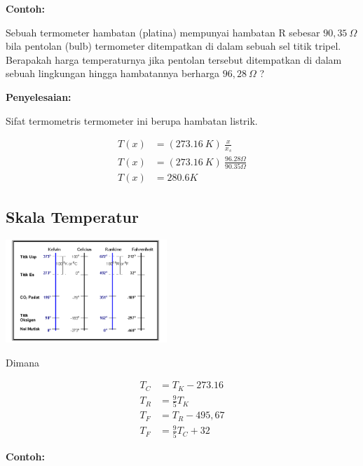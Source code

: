 \documentclass[twocolumn, 11pt]{article}%
\begin{document}
        \textbf{Contoh:}

        Sebuah termometer hambatan (platina) mempunyai hambatan R sebesar $90,35\ \Omega$ bila pentolan (bulb) termometer ditempatkan di dalam sebuah sel titik tripel. Berapakah harga temperaturnya jika pentolan tersebut ditempatkan di dalam sebuah lingkungan hingga hambatannya berharga $96,28\ \Omega$ ?
        
        \textbf{Penyelesaian:}

        Sifat termometris termometer ini berupa hambatan listrik.

        \begin{equation*}
            \begin{split}
                T(x) &= (273.16\ K)\ \frac{x}{x_s}\\
                T(x) &= (273.16\ K)\ \frac{96.28 \Omega}{90.35 \Omega}\\
                T(x) &= 280.6 K
            \end{split}
        \end{equation*}

    \subsection{Skala Temperatur}
        \begin{center}
            \includegraphics[width=230px]{3.png}
        \end{center}

        Dimana

        \begin{equation*}
            \begin{split}
                T_C &= T_K - 273.16\\
                T_R &= \frac{9}{5} T_K\\
                T_F &= T_R - 495,67\\
                T_F &= \frac{9}{5} T_C + 32
            \end{split}
        \end{equation*}

        \textbf{Contoh:}
\end{document}
